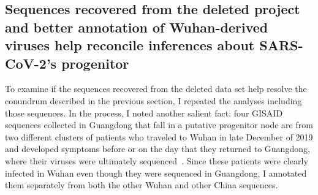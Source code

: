 \documentclass[9pt,twocolumn,twoside]{gsajnl_modified}
\begin{document}
\subsection{Sequences recovered from the deleted project and better annotation of Wuhan-derived viruses help reconcile inferences about SARS-CoV-2's progenitor}
To examine if the sequences recovered from the deleted data set help resolve the conundrum described in the previous section, I repeated the analyses including those sequences.
In the process, I noted another salient fact: four GISAID sequences collected in Guangdong that fall in a putative progenitor node are from two different clusters of patients who traveled to Wuhan in late December of 2019 and developed symptoms before or on the day that they returned to Guangdong, where their viruses were ultimately sequenced~\citep{chan2020familial, kang2020evidence}.
Since these patients were clearly infected in Wuhan even though they were sequenced in Guangdong, I annotated them separately from both the other Wuhan and other China sequences.
\end{document}
